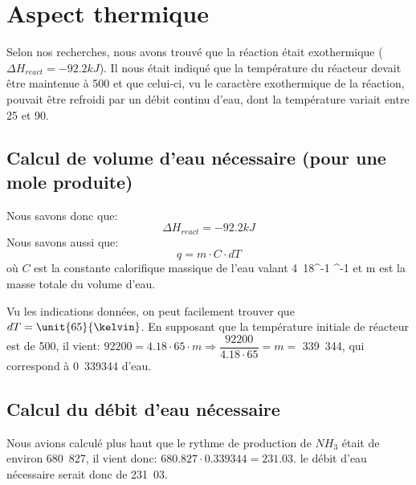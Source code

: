 \documentclass[11pt,a4paper]{report}
\begin{document}
\section*{Aspect thermique}
Selon nos recherches, nous avons trouvé que la réaction était exothermique ($\Delta H_{react} = -92.2kJ$).
Il nous était indiqué que la température du réacteur devait être maintenue à \unit{500}{\celsius} et que celui-ci, 
vu le caractère exothermique de la réaction, pouvait être refroidi par un débit continu d'eau, dont la température 
variait entre \unit{25}{\celsius} et \unit{90}{\celsius}.

\subsection*{Calcul de volume d'eau nécessaire (pour une mole produite)}
Nous savons donc que: $$\Delta H_{react} = \unit{-92.2}{kJ}$$
Nous savons aussi que:
 $$q = m \cdot C \cdot dT$$
où $C$ est la constante calorifique massique de l'eau valant \unit{4.18}{\joule \cdot \celsius^{-1} \cdot \gram^{-1}} et m est 
 la masse totale du volume d'eau.

 Vu les indications données, on peut facilement trouver que $dT=\unit{65}{\kelvin}$. En supposant que la température initiale de 
 réacteur est de \unit{500}{\celsius}, il vient: 
$92200 = 4.18 \cdot 65 \cdot m \Rightarrow \dfrac{92200}{4.18 \cdot 65} = m =$ \unit{339.344}{\gram}, qui correspond à \unit{0.339344}{\liter} d'eau.

\subsection*{Calcul du débit d'eau nécessaire}

Nous avions calculé plus haut que le rythme de production de $NH_3$ était de environ \unit{680.827}{\mole\per\second},
il vient donc:  $680.827 \cdot 0.339344 = 231.03$. 
le débit d'eau nécessaire serait donc de \unit{231.03}{\liter\per\second}.
\end{document}
